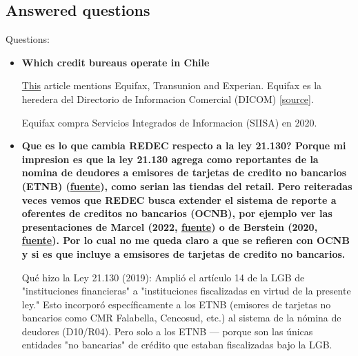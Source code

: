 \documentclass[12pt]{article}
\theoremstyle{plain}
\theoremstyle{plain}
\theoremstyle{definition}  %
\theoremstyle{remark}  %
\begin{document}
\subsection{Answered questions}

Questions: 

\begin{itemize}

     \item \textbf{Which credit bureaus operate in Chile }
    
    \href{https://www.diarioconcepcion.cl/pais/2023/05/12/por-ley-no-se-puede-informar-deudas-de-salud-en-dicom.html}{This} article mentions Equifax, Transunion and Experian. 
    Equifax es la heredera del Directorio de Informacion Comercial (DICOM) [\href{https://es.wikipedia.org/wiki/Equifax_(Chile)}{source}]. 

    \textcite{espinoza_fiscalinacional_2020}
    Equifax compra Servicios Integrados de Informacion (SIISA) en 2020.

 
    \item \textbf{Que es lo que cambia REDEC respecto a la ley 21.130? 
    Porque mi impresion es que la ley 21.130 agrega como reportantes de la nomina de deudores a emisores de tarjetas de credito no bancarios (ETNB) (\href{https://www.cmfchile.cl/sitio/aplic/serdoc/ver_sgd.php?s567=aef303581a81b5d6b8c7f134b13d05b7VFdwQmVVMVVRVFZOUkUweVRWUm5lVTEzUFQwPQ%3D%3D&secuencia=-1&t=1641949996}{fuente}), como serian las tiendas del retail. Pero reiteradas veces vemos que REDEC busca extender el sistema de reporte a oferentes de creditos no bancarios (OCNB), por ejemplo ver las presentaciones de Marcel (2022, \href{a. https://www.
    camara.cl/verDoc.aspx?prmID=253759&prmTipo=DOCUMENTO COMISION}{fuente}) o de Berstein (2020, \href{https://www.bcentral.cl/documents/33528/133217/sbj27112020.pdf/1b00823d-93f4-193c-14ee-133b703af529?t=1693928559800}{fuente}). Por lo cual no me queda claro a que se refieren con OCNB y si es que incluye a emsisores de tarjetas de credito no bancarios. }


    Qué hizo la Ley 21.130 (2019): Amplió el artículo 14 de la LGB de "instituciones financieras" a "instituciones fiscalizadas en virtud de la presente ley." Esto incorporó específicamente a los ETNB (emisores de tarjetas no bancarios como CMR Falabella, Cencosud, etc.) al sistema de la nómina de deudores (D10/R04). Pero solo a los ETNB — porque son las únicas entidades "no bancarias" de crédito que estaban fiscalizadas bajo la LGB.


\end{itemize}
\end{document}
